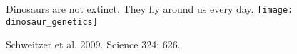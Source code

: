 \documentclass[t]{beamer}
\begin{document}
%
{
\begin{frame}[b]{Dinosaurs are not extinct. They fly around us every day.}
	\centering
	\texttt{[image: dinosaur\_genetics]}

	\vfilll

	\tiny\hfill Schweitzer et al. 2009. Science 324: 626.
\end{frame}
}
%
%
%
%	
%	
%
%
%
%
\end{document}
